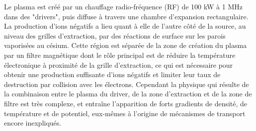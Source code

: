 \begin{refsection}
 Le plasma est créé par un chauffage radio-fréquence
(RF) de 100 kW à 1 MHz dans des "drivers", puis diffuse à travers une chambre
d'expansion rectangulaire. La production d'ions négatifs a lieu quant à elle de
l'autre côté de la source, au niveau des grilles d'extraction, par des
réactions de surface sur les parois vaporisées au césium.
Cette région est séparée de la zone de création du plasma par un filtre magnétique dont le rôle
principal est de réduire la température électronique à proximité de la grille
d'extraction, ce qui est nécessaire pour obtenir une production suffisante
d'ions négatifs et limiter leur taux de destruction par collision avec les
électrons. Cependant la physique qui résulte de la combinaison entre
le plasma du driver, de la zone d'extraction et de la zone de filtre est très
complexe, et entraîne l'apparition de forts gradients de densité,
de température et de potentiel, eux-mêmes à l'origine de mécanismes de transport
encore inexpliqués. 


\end{refsection}
